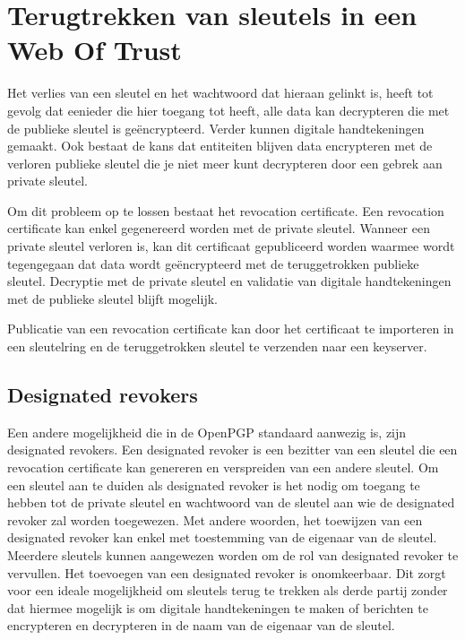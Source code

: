 \section{Terugtrekken van sleutels in een Web Of Trust}
\label{sec:terugtrekken-van-sleutels-in-een-wot}

Het verlies van een sleutel en het wachtwoord dat hieraan gelinkt is, heeft tot
gevolg dat eenieder die hier toegang tot heeft, alle data kan decrypteren die
met de publieke sleutel is geëncrypteerd. Verder kunnen digitale handtekeningen
gemaakt. Ook bestaat de kans dat entiteiten blijven data encrypteren met de
verloren publieke sleutel die je niet meer kunt decrypteren door een gebrek aan
private sleutel.

Om dit probleem op te lossen bestaat het revocation certificate. Een revocation
certificate kan enkel gegenereerd worden met de private sleutel. Wanneer een
private sleutel verloren is, kan dit certificaat gepubliceerd worden waarmee
wordt tegengegaan dat data wordt geëncrypteerd met de teruggetrokken publieke
sleutel. Decryptie met de private sleutel en validatie van digitale
handtekeningen met de publieke sleutel blijft mogelijk.
\autocite{GNUManualGettingStarted}

Publicatie van een revocation certificate kan door het certificaat te importeren
in een sleutelring en de teruggetrokken sleutel te verzenden naar een keyserver.

\subsection{Designated revokers}
\label{subsec:designated-revokers}

Een andere mogelijkheid die in de \gls{OpenPGP} standaard aanwezig is, zijn designated
revokers. Een designated revoker is een bezitter van een sleutel die een
revocation certificate kan genereren en verspreiden van een andere sleutel.
\autocite{rfc4880} Om een sleutel aan te duiden als designated revoker is het
nodig om toegang te hebben tot de private sleutel en wachtwoord van de sleutel
aan wie de designated revoker zal worden toegewezen. Met andere woorden, het
toewijzen van een designated revoker kan enkel met toestemming van de eigenaar
van de sleutel. Meerdere sleutels kunnen aangewezen worden om de rol van
designated revoker te vervullen. Het toevoegen van een designated revoker is
onomkeerbaar. Dit zorgt voor een ideale mogelijkheid om sleutels terug te
trekken als derde partij zonder dat hiermee mogelijk is om digitale
handtekeningen te maken of berichten te encrypteren en decrypteren in de naam
van de eigenaar van de sleutel.

